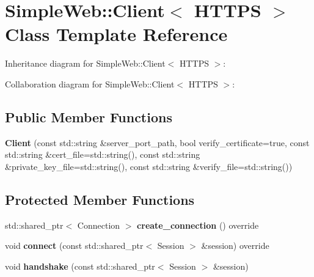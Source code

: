 \hypertarget{classSimpleWeb_1_1Client_3_01HTTPS_01_4}{}\section{Simple\+Web\+:\+:Client$<$ H\+T\+T\+PS $>$ Class Template Reference}
\label{classSimpleWeb_1_1Client_3_01HTTPS_01_4}


Inheritance diagram for Simple\+Web\+:\+:Client$<$ H\+T\+T\+PS $>$\+:


Collaboration diagram for Simple\+Web\+:\+:Client$<$ H\+T\+T\+PS $>$\+:
\subsection*{Public Member Functions}
\begin{DoxyCompactItemize}
\item 
{\bfseries Client} (const std\+::string \&server\+\_\+port\+\_\+path, bool verify\+\_\+certificate=true, const std\+::string \&cert\+\_\+file=std\+::string(), const std\+::string \&private\+\_\+key\+\_\+file=std\+::string(), const std\+::string \&verify\+\_\+file=std\+::string())\hypertarget{classSimpleWeb_1_1Client_3_01HTTPS_01_4_abd87d3dc08c9fed3a60f18c749b8bacd}{}\label{classSimpleWeb_1_1Client_3_01HTTPS_01_4_abd87d3dc08c9fed3a60f18c749b8bacd}

\end{DoxyCompactItemize}
\subsection*{Protected Member Functions}
\begin{DoxyCompactItemize}
\item 
std\+::shared\+\_\+ptr$<$ Connection $>$ {\bfseries create\+\_\+connection} () override\hypertarget{classSimpleWeb_1_1Client_3_01HTTPS_01_4_ab2dad745b868b0aa7fafe51016b97863}{}\label{classSimpleWeb_1_1Client_3_01HTTPS_01_4_ab2dad745b868b0aa7fafe51016b97863}

\item 
void {\bfseries connect} (const std\+::shared\+\_\+ptr$<$ Session $>$ \&session) override\hypertarget{classSimpleWeb_1_1Client_3_01HTTPS_01_4_a6507c2e8b4a0d99889530a97c3642384}{}\label{classSimpleWeb_1_1Client_3_01HTTPS_01_4_a6507c2e8b4a0d99889530a97c3642384}

\item 
void {\bfseries handshake} (const std\+::shared\+\_\+ptr$<$ Session $>$ \&session)\hypertarget{classSimpleWeb_1_1Client_3_01HTTPS_01_4_a44991dc5c2497a15133fa1b35bf9901c}{}\label{classSimpleWeb_1_1Client_3_01HTTPS_01_4_a44991dc5c2497a15133fa1b35bf9901c}

\end{DoxyCompactItemize}
